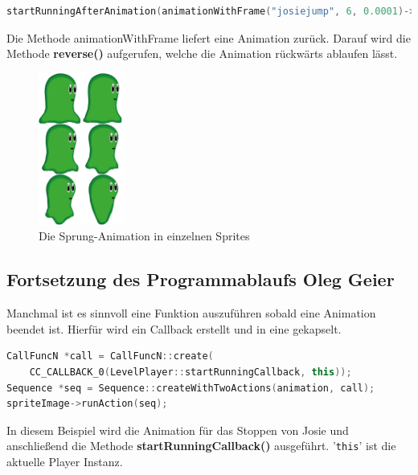 \begin{lstlisting}[label=lst:build_josie_animation_reverse,
				   language=C++,
				   firstnumber=96,
				   caption=Sequence Umkehren ( LevelPlayer.cpp )]
startRunningAfterAnimation(animationWithFrame("josiejump", 6, 0.0001)->reverse())
\end{lstlisting}

Die Methode animationWithFrame liefert eine Animation zurück. Darauf wird die Methode \textbf{reverse()} aufgerufen, welche die Animation rückwärts ablaufen lässt.

\begin{figure}[H]
  \centering
  \includegraphics[height=5cm]{resources/josiejump}
  \caption{Die Sprung-Animation in einzelnen Sprites}
  \label{fig:josie_jump} 
\end{figure}


\subsection[Fortsetzung des Programmablaufs]{Fortsetzung des Programmablaufs \scriptsize Oleg Geier}

Manchmal ist es sinnvoll eine Funktion auszuführen sobald eine Animation beendet ist. Hierfür wird ein Callback erstellt und in eine  gekapselt.

\begin{lstlisting}[label=lst:CallFuncN,
				   language=C++,
				   firstnumber=116,
				   caption=startRunningAfterAnimation ( LevelPlayer.cpp )]
CallFuncN *call = CallFuncN::create(
	CC_CALLBACK_0(LevelPlayer::startRunningCallback, this));
Sequence *seq = Sequence::createWithTwoActions(animation, call);
spriteImage->runAction(seq);
\end{lstlisting}

In diesem Beispiel wird die Animation für das Stoppen von Josie und anschließend die Methode \textbf{startRunningCallback()} ausgeführt. '\texttt{this}' ist die aktuelle Player Instanz.



